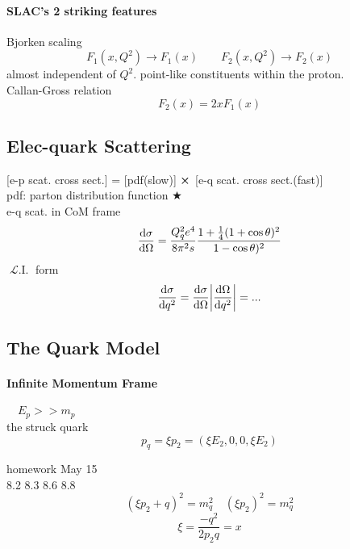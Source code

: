 \documentclass[a4paper]{article}
\DeclareMathOperator{\ra}{\rightarrow}
\DeclareMathOperator{\LI}{\mathscr{L}.I.}
\numberwithin{equation}{section}
\begin{document}
\paragraph{SLAC's 2 striking features}
Bjorken scaling
\begin{equation}\label{key}
F_1(x,Q^2) \ra F_1(x) \qquad F_2(x,Q^2) \ra F_2(x)
\end{equation}
almost independent of $ Q^2 $. point-like constituents within the proton.\\
Callan-Gross relation
\begin{equation}\label{key}
F_2(x) = 2x F_1(x)
\end{equation}

\subsection{Elec-quark Scattering}
[e-p scat. cross sect.] = [pdf(slow)] $ \cross $ [e-q scat. cross sect.(fast)]\\
pdf: parton distribution function $ \bigstar $\\

e-q scat. in CoM frame
\begin{equation}\label{key}
\dv{\sigma}{\Omega} = \dfrac{Q_q^2e^4}{8\pi^2 s} \dfrac{1 + \tfrac{1}{4}(1 + \cos\theta)^2}{1 - \cos\theta)^2}
\end{equation}
$ \LI $ form
\begin{equation}\label{key}
\dv{\sigma}{q^2} = \dv{\sigma}{\Omega}\abs{\dv{\Omega}{q^2}} = ...
\end{equation}

\subsection{The Quark Model}
\paragraph{Infinite Momentum Frame}
$\quad  E_p >> m_p $\\
the struck quark
\begin{equation}\label{key}
p_q = \xi p_2 = (\xi E_2, 0, 0, \xi E_2)
\end{equation}

homework May 15\\
8.2 8.3 8.6 8.8\\

\begin{equation}\label{key}
(\xi p_2 + q)^2 = m_q^2  \quad (\xi p_2)^2 = m_q^2
\end{equation}
\begin{equation}\label{key}
\xi = \dfrac{-q^2}{2p_2 q} = x
\end{equation}
\end{document}
